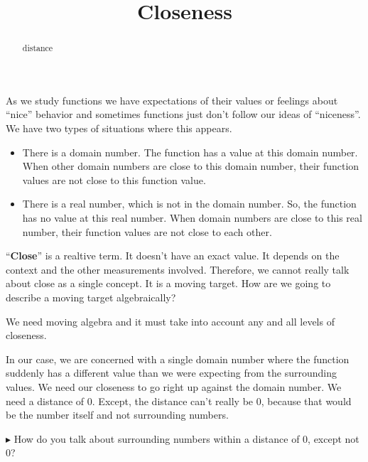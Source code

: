 \documentclass{ximera}
\title{Closeness}
\begin{document}
\begin{abstract}
distance
\end{abstract}
\maketitle







As we study functions we have expectations of their values or feelings about ``nice'' behavior and sometimes functions just don't follow our ideas of ``niceness''.  We have two types of situations where this appears.

\begin{itemize}
\item There is a domain number. The function has a value at this domain number. When other domain numbers are close to this domain number, their function values are not close to this function value.
\item There is a real number, which is not in the domain number. So, the function has no value at this real number. When  domain numbers are close to this real number, their function values are not close to each other.
\end{itemize}



``\textbf{\textcolor{purple!85!blue}{Close}}'' is a realtive term.  It doesn't have an exact value.  It depends on the context and the other measurements involved.  Therefore, we cannot really talk about close as a single concept.  It is a moving target.  How are we going to describe a moving target algebraically?

We need moving algebra and it must take into account any and all levels of closeness.


In our case, we are concerned with a single domain number where the function suddenly has a different value than we were expecting from the surrounding values.  We need our closeness to go right up against the domain number. We need a distance of $0$.  Except, the distance can't really be $0$, because that would be the number itself and not surrounding numbers.

\textbf{\textcolor{red!90!darkgray}{$\blacktriangleright$}}  How do you talk about surrounding numbers within a distance of $0$, except not $0$?
\end{document}
